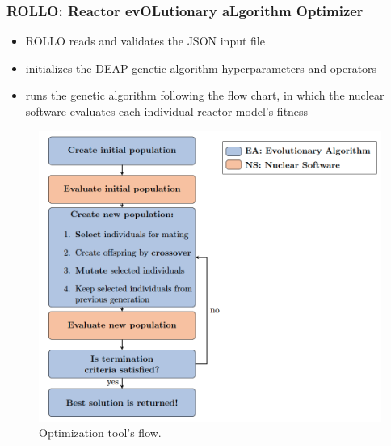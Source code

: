 \begin{frame}
    \frametitle{ROLLO: Reactor evOLutionary aLgorithm Optimizer}
    \begin{minipage}[c]{0.45\textwidth}
        \begin{itemize}
            \item ROLLO reads and validates the JSON input file
            \item initializes the DEAP genetic algorithm hyperparameters and 
            operators 
            \item runs the genetic algorithm following the flow chart, in which the 
            nuclear software evaluates each individual reactor model's fitness
        \end{itemize}
        \end{minipage}\hfill
        \begin{minipage}[c]{0.52\textwidth}
            \centering
            \begin{figure}
                \includegraphics[width=\linewidth]{figures/rollo-flow.png} 
                \caption{Optimization tool's flow.}
            \end{figure}
        \end{minipage}
\end{frame}

